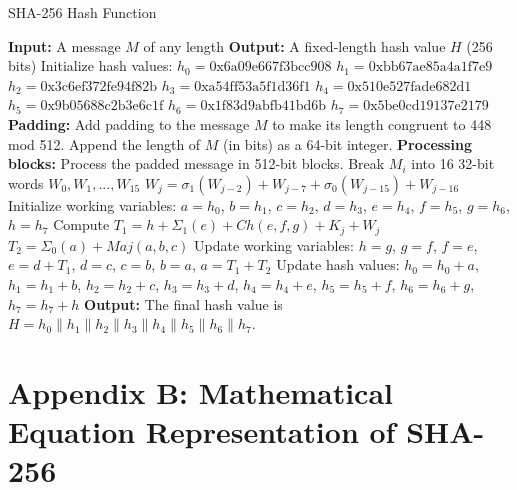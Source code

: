 \begin{algorithm}
\caption{SHA-256 Hash Function}
\begin{algorithmic}
\State \textbf{Input:} A message \( M \) of any length
\State \textbf{Output:} A fixed-length hash value \( H \) (256 bits)
\State Initialize hash values:
\State \( h_0 = \text{0x6a09e667f3bcc908} \)
\State \( h_1 = \text{0xbb67ae85a4a1f7e9} \)
\State \( h_2 = \text{0x3c6ef372fe94f82b} \)
\State \( h_3 = \text{0xa54ff53a5f1d36f1} \)
\State \( h_4 = \text{0x510e527fade682d1} \)
\State \( h_5 = \text{0x9b05688c2b3e6c1f} \)
\State \( h_6 = \text{0x1f83d9abfb41bd6b} \)
\State \( h_7 = \text{0x5be0cd19137e2179} \)
\State \textbf{Padding:} Add padding to the message \( M \) to make its length congruent to 448 mod 512.
\State Append the length of \( M \) (in bits) as a 64-bit integer.
\State \textbf{Processing blocks:} Process the padded message in 512-bit blocks.
    \State Break \( M_i \) into 16 32-bit words \( W_0, W_1, ..., W_{15} \)
        \State \( W_j = \sigma_1(W_{j-2}) + W_{j-7} + \sigma_0(W_{j-15}) + W_{j-16} \)
    \EndFor
    \State Initialize working variables:
    \State \( a = h_0 \), \( b = h_1 \), \( c = h_2 \), \( d = h_3 \), \( e = h_4 \), \( f = h_5 \), \( g = h_6 \), \( h = h_7 \)
        \State Compute \( T_1 = h + \Sigma_1(e) + Ch(e,f,g) + K_j + W_j \)
        \State \( T_2 = \Sigma_0(a) + Maj(a,b,c) \)
        \State Update working variables:
        \State \( h = g \), \( g = f \), \( f = e \), \( e = d + T_1 \), \( d = c \), \( c = b \), \( b = a \), \( a = T_1 + T_2 \)
    \EndFor
    \State Update hash values:
    \State \( h_0 = h_0 + a \), \( h_1 = h_1 + b \), \( h_2 = h_2 + c \), \( h_3 = h_3 + d \), 
    \State \( h_4 = h_4 + e \), \( h_5 = h_5 + f \), \( h_6 = h_6 + g \), \( h_7 = h_7 + h \)
\EndFor
\State \textbf{Output:} The final hash value is \( H = h_0 \parallel h_1 \parallel h_2 \parallel h_3 \parallel h_4 \parallel h_5 \parallel h_6 \parallel h_7 \).
\end{algorithmic}
\end{algorithm}

\clearpage
\section*{\centering Appendix B: Mathematical Equation Representation of SHA-256}

